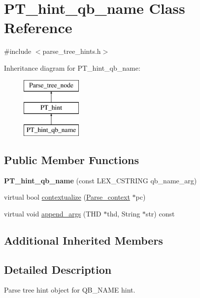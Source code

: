 \hypertarget{classPT__hint__qb__name}{}\section{P\+T\+\_\+hint\+\_\+qb\+\_\+name Class Reference}
\label{classPT__hint__qb__name}


{\ttfamily \#include $<$parse\+\_\+tree\+\_\+hints.\+h$>$}

Inheritance diagram for P\+T\+\_\+hint\+\_\+qb\+\_\+name\+:\begin{figure}[H]
\begin{center}
\leavevmode
\includegraphics[height=3.000000cm]{classPT__hint__qb__name}
\end{center}
\end{figure}
\subsection*{Public Member Functions}
\begin{DoxyCompactItemize}
\item 
\mbox{\label{classPT__hint__qb__name_ac50b5a8f6742cfa01ee04bb0e6739ae9}} 
{\bfseries P\+T\+\_\+hint\+\_\+qb\+\_\+name} (const L\+E\+X\+\_\+\+C\+S\+T\+R\+I\+NG qb\+\_\+name\+\_\+arg)
\item 
virtual bool \mbox{\hyperlink{classPT__hint__qb__name_a03c181a0936981540b7f7ce2dd973406}{contextualize}} (\mbox{\hyperlink{structParse__context}{Parse\+\_\+context}} $\ast$pc)
\item 
virtual void \mbox{\hyperlink{classPT__hint__qb__name_af186344b8fe2dcc76c187ce8dec59422}{append\+\_\+args}} (T\+HD $\ast$thd, String $\ast$str) const
\end{DoxyCompactItemize}
\subsection*{Additional Inherited Members}


\subsection{Detailed Description}
Parse tree hint object for Q\+B\+\_\+\+N\+A\+ME hint. 

